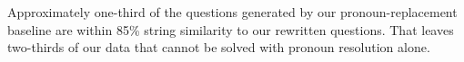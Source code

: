 Approximately one-third of the questions generated by our
pronoun-replacement baseline are within 85\% string similarity to our
rewritten questions.
%
That leaves two-thirds of our data that cannot be solved with pronoun resolution alone. 
%
%

\begin{comment}

\subsection{Model Analysis}
\label{sec:models}
\begin{table*}
\centering
\begin{tabular}{lp{6cm}p{8.5cm}}
	  \toprule
	 & \textbf{Seq2Seq output } & \textbf{Reference}\\
  \hline
1 & What did Chamberlain's men do? & What did Chamberlain's men do during the Battle of Gettysburg? \\
2 & How many games did Ozzie Smith win? & How many games did the Cardinals win while Ozzie Smith played? \\
3 & Did 108th get to the finals? & Did the US Women's Soccer Team get to the finals in the 1999 World Cup? \\
4 & Did Gabriel Batistuta reside in any other countries, besides touring in the Copa America? & Besides Argentina, did Gabriel Batistuta reside in any other countries? \\
5 & Did La Comedia have any more works than La Comedia 3? & Did Giannina Braschi have any more works than United States of Banana, La Comedia and Asalto al tiempo? \\
\bottomrule
\end{tabular}
\caption{Example erroneous rewrites generated by the Seq2Seq models
and their corresponding reference rewrites. The dominant
source of error is the model tendency to produce
short rewrites (Examples 1--3). Related entities (Copa America and Argentina in Example 4) distract the model. The model
struggles with listing multiple entities mentioned in different
parts of the context (Example 5).
}
  \label{tab:erranalysis}
\end{table*}


\end{comment}
